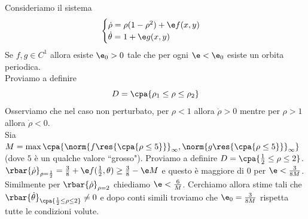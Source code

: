\begin{example}
Consideriamo il sistema
\[\begin{cases}
\dot \rho=\rho(1-\rho^2) + \e f(x,y)\\
\dot \theta=1+\e g(x,y)
\end{cases}\]
Se $f,g\in C^1$ allora esiste $\e_0>0$ tale che per ogni $\e<\e_0$ esiste un orbita periodica.\\
Proviamo a definire
\[D=\cpa{\rho_1\leq\rho\leq\rho_2}\]
Osserviamo che nel caso non perturbato, per $\rho<1$ allora $\dot \rho>0$ mentre per $\rho>1$ allora $\dot \rho<0$.\\
Sia $M=\max\cpa{\norm {f\res{\cpa{\rho\leq 5}}}_\infty, \norm {g\res{\cpa{\rho\leq 5}}}_\infty}$ (dove $5$ \`e un qualche valore ``grosso"). Proviamo a definire $D=\cpa{\frac12\leq \rho\leq 2}$.\\
$\rbar{\dot \rho}_{\rho=\frac12}=\frac38+\e f(\frac12,\theta)\geq \frac38-\e M$ e questo \`e maggiore di $0$ per $\e<\frac3{8M}$.
Similmente per $\rbar{\dot \rho}_{\rho=2}$ chiediamo $\e<\frac6M$. Cerchiamo allora stime tali che
$\rbar{\dot \theta}_{\cpa{\frac12\leq \rho\leq 2}}\neq 0$ e dopo conti simili troviamo che $\e_0=\frac3{8M}$ rispetta tutte le condizioni volute.
\end{example}